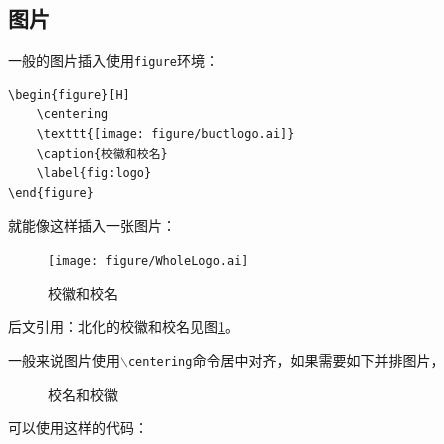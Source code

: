     \subsection{图片}\label{subsec:fig}
    一般的图片插入使用\texttt{figure}环境：

    \begin{lstlisting}[caption=插入图片,label=code:addfig]
\begin{figure}[H]
    \centering
    \texttt{[image: figure/buctlogo.ai]}
    \caption{校徽和校名}
    \label{fig:logo}
\end{figure}        
    \end{lstlisting}
    
    就能像这样插入一张图片：
    \begin{figure}[H]
        \centering
        \texttt{[image: figure/WholeLogo.ai]}
        \caption{校徽和校名}
        \label{fig:WholeLogo}
    \end{figure}
    后文引用：北化的校徽和校名见图\ref{fig:WholeLogo}。

    一般来说图片使用\texttt{$\backslash$centering}命令居中对齐，如果需要如下并排图片，
	    \begin{figure}[H]
        \centering
        \hspace{1cm}
        \caption{校名和校徽}
        \label{fig:wholelogo}
    \end{figure}
	可以使用这样的代码：
    
